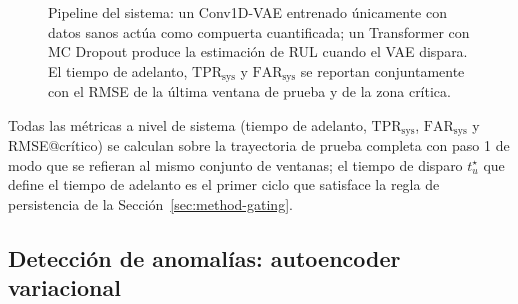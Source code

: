 \documentclass[5p,times,authoryear]{elsarticle}
\begin{document}
\begin{figure}[!t]
\caption{Pipeline del sistema: un Conv1D-VAE entrenado únicamente con datos sanos actúa como compuerta cuantificada; un Transformer con MC Dropout produce la estimación de RUL cuando el VAE dispara. El tiempo de adelanto, $\mathrm{TPR}_{\mathrm{sys}}$ y $\mathrm{FAR}_{\mathrm{sys}}$ se reportan conjuntamente con el RMSE de la última ventana de prueba y de la zona crítica.}
\label{fig:pipeline}
\end{figure}

Todas las métricas a nivel de sistema (tiempo de adelanto, $\mathrm{TPR}_{\mathrm{sys}}$, $\mathrm{FAR}_{\mathrm{sys}}$ y RMSE@crítico) se calculan sobre la trayectoria de prueba completa con paso 1 de modo que se refieran al mismo conjunto de ventanas; el tiempo de disparo $t^\star_u$ que define el tiempo de adelanto es el primer ciclo que satisface la regla de persistencia de la Sección~\ref{sec:method-gating}.

\subsection{Detección de anomalías: autoencoder variacional}\label{sec:method-vae}
\end{document}
